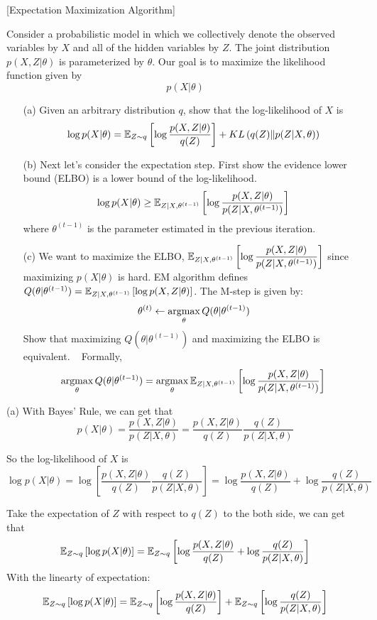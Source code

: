 \item {} [Expectation Maximization Algorithm]

Consider a probabilistic model in which we collectively denote the observed variables by $X$ and all of the hidden variables by $Z$. The joint distribution $p(X,Z|\theta)$ is parameterized by $\theta$. Our goal is to maximize the likelihood function given by
$$p(X|\theta)$$

\begin{itemize}
\item[(a)] Given an arbitrary distribution $q$, show that the log-likelihood of $X$ is~
$$\log p(X|\theta) = \mathbb{E}_{Z\sim q}\left [\log\dfrac{p(X, Z|\theta)}{q(Z)}\right] + KL\left(q(Z)\| p(Z|X,\theta)\right)$$

\item[(b)] Next let's consider the expectation step. First show the evidence lower bound (ELBO) is a lower bound of the log-likelihood. ~
$$\log p(X|\theta)\geq\mathbb{E}_{Z|X,\theta^{(t-1)}}\left[\log\dfrac{p(X,Z|\theta)}{p(Z|X,\theta^{(t-1)})}\right]$$
where $\theta^{(t-1)}$ is the parameter estimated in the previous iteration.

\item[(c)] We want to maximize the ELBO, $\mathbb{E}_{Z|X,\theta^{(t-1)}}\left[\log \dfrac{p(X,Z|\theta)}{p(Z|X,\theta^{(t-1)})}\right]$ since maximizing $p(X|\theta)$ is hard. EM algorithm defines $Q(\theta|\theta^{(t-1)}) = \mathbb{E}_{Z|X,\theta^{(t-1)}}\left[ \log p(X,Z|\theta) \right]$. The M-step is given by:
$$\theta^{(t)} \leftarrow \mathop{\rm argmax}_{\theta} Q(\theta|\theta^{(t-1)})$$
Show that maximizing $Q(\theta|\theta^{(t-1)})$ and maximizing the ELBO is equivalent. ~ Formally,
$$\mathop{\rm argmax}_{\theta} Q(\theta|\theta^{(t-1)}) = \mathop{\rm argmax}_{\theta} \mathbb{E}_{Z|X,\theta^{(t-1)}}\left[\log \dfrac{p(X,Z|\theta)}{p(Z|X,\theta^{(t-1)})}\right]$$
\end{itemize}

\solution

(a) With Bayes' Rule, we can get that
$$p(X|\theta)=\dfrac{p(X,Z|\theta)}{p(Z|X,\theta)} = \dfrac{p(X,Z|\theta)}{q(Z)}\dfrac{q(Z)}{p(Z|X,\theta)}$$

So the log-likelihood of $X$ is
$$\log p(X|\theta)=\log\left [\dfrac{p(X,Z|\theta)}{q(Z)}\dfrac{q(Z)}{p(Z|X,\theta)}\right]=\log\dfrac{p(X,Z|\theta)}{q(Z)}+\log\dfrac{q(Z)}{p(Z|X,\theta)}$$

Take the expectation of $Z$ with respect to $q(Z)$ to the both side, we can get that
$$\mathbb{E}_{Z\sim q}\left [\log p(X|\theta)\right]=\mathbb{E}_{Z\sim q}\left [\log\dfrac{p(X,Z|\theta)}{q(Z)}+\log\dfrac{q(Z)}{p(Z|X,\theta)}\right]$$
With the linearty of expectation:
$$\mathbb{E}_{Z\sim q}\left [\log p(X|\theta)\right]=\mathbb{E}_{Z\sim q}\left [\log\dfrac{p(X,Z|\theta)}{q(Z)}\right]+\mathbb{E}_{Z\sim q}\left [\log\dfrac{q(Z)}{p(Z|X,\theta)}\right]$$

